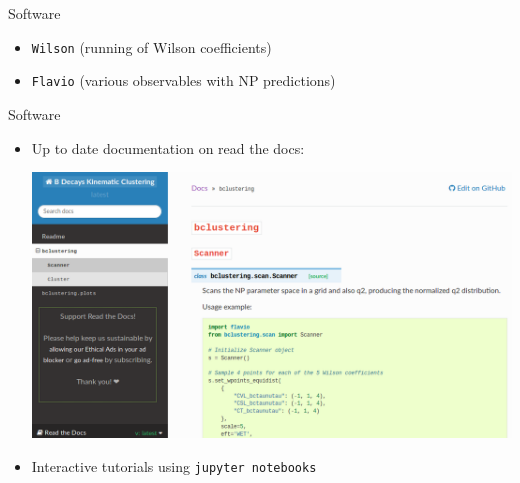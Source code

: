 \begin{frame}{Software}
\begin{itemize}
        \item {} \texttt{Wilson} {\footnotesize(running of Wilson coefficients)}
        \item {} \texttt{Flavio} {\footnotesize(various observables with NP predictions)}
    \end{itemize}
\end{frame}

\begin{frame}{Software}
    \begin{itemize}
        \item Up to date documentation on read the docs:\\[3ex]
        \begin{center}\includegraphics[width=0.8\linewidth]{figures/scrot/readthedocs.png}\end{center}
        \vspace{2ex}
        \item Interactive tutorials using  \texttt{jupyter notebooks}
    \end{itemize}
    
    \bigskip
    
\end{frame}

